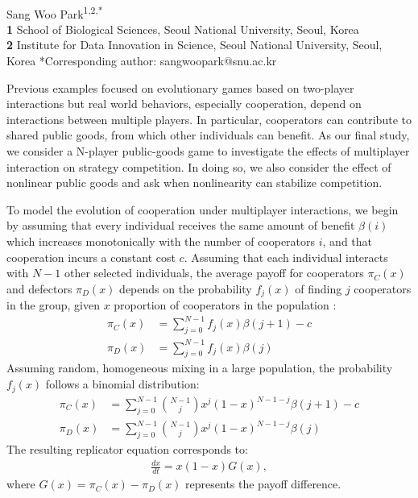 \documentclass[12pt]{article}
\date{\today}
\begin{document}
\begin{flushleft}{
	\Large
	\textbf{}
}
\newline
\\
Sang Woo Park\textsuperscript{1,2,*}
\\
\bigskip
\textbf{1} School of Biological Sciences, Seoul National University, Seoul, Korea\\
\textbf{2} Institute for Data Innovation in Science, Seoul National University, Seoul, Korea
*Corresponding author: sangwoopark@snu.ac.kr
\end{flushleft}

Previous examples focused on evolutionary games based on two-player interactions but real world behaviors, especially cooperation, depend on interactions between multiple players.
In particular, cooperators can contribute to shared public goods, from which other individuals can benefit.
As our final study, we consider a N-player public-goods game to investigate the effects of multiplayer interaction on strategy competition.
In doing so, we also consider the effect of nonlinear public goods and ask when nonlinearity can stabilize competition.

To model the evolution of cooperation under multiplayer interactions,
we begin by assuming that every individual receives the same amount of benefit $\beta(i)$ which increases monotonically with the number of cooperators $i$, and that cooperation incurs a constant cost $c$.
Assuming that each individual interacts with $N-1$ other selected individuals, the average payoff for cooperators $\pi_C(x)$ and defectors $\pi_D(x)$ depends on the probability $f_j(x)$ of finding $j$ cooperators in the group, given $x$ proportion of cooperators in the population \citep{archetti2012game}:
\begin{align}
\pi_C(x) &= \sum_{j=0}^{N-1} f_j(x)\beta(j+1) -c\\
\pi_D(x) &= \sum_{j=0}^{N-1} f_j(x)\beta(j)
\end{align}
Assuming random, homogeneous mixing in a large population, the probability $f_j(x)$ follows a binomial distribution:
\begin{align}
\pi_C(x) &= \sum_{j=0}^{N-1} \binom{N-1}{j} x^j (1-x)^{N-1-j} \beta(j+1) -c\\
\pi_D(x) &= \sum_{j=0}^{N-1} \binom{N-1}{j} x^j (1-x)^{N-1-j}  \beta(j)
\end{align}
The resulting replicator equation corresponds to:
\begin{align}
\frac{dx}{dt} = x(1-x) G(x),
\end{align}
where $G(x) = \pi_C(x)-\pi_D(x)$ represents the payoff difference.
\end{document}
